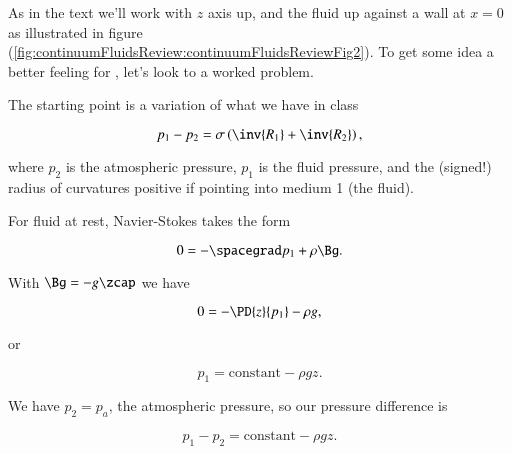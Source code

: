 \begin{Answer}[ref={problem:fluids:review:q3}]
As in the text we'll work with $z$ axis up, and the fluid up against a wall at $x = 0$ as illustrated in figure (\ref{fig:continuumFluidsReview:continuumFluidsReviewFig2}).
To get some idea a better feeling for , let's look to a worked problem.  


The starting point is a variation of what we have in class

\begin{equation}\label{eqn:continuumFluidsReview:1530}
p_1 - p_2 = \sigma \left( \inv{R_1} + \inv{R_2} \right),
\end{equation}

where $p_2$ is the atmospheric pressure, $p_1$ is the fluid pressure, and the (signed!) radius of curvatures positive if pointing into medium 1 (the fluid).

For fluid at rest, Navier-Stokes takes the form

\begin{equation}\label{eqn:continuumFluidsReview:1630}
0 = -\spacegrad p_1 + \rho \Bg.
\end{equation}

With $\Bg = -g \zcap$ we have

\begin{equation}\label{eqn:continuumFluidsReview:1650}
0 = -\PD{z}{p_1} - \rho g,
\end{equation}

or

\begin{equation}\label{eqn:continuumFluidsReview:1670}
p_1 = \text{constant} - \rho g z.
\end{equation}

%

We have $p_2 = p_a$, the atmospheric pressure, so our pressure difference is

\begin{equation}\label{eqn:continuumFluidsReview:1570}
p_1 - p_2 = \text{constant} - \rho g z.
\end{equation}


\end{Answer}
